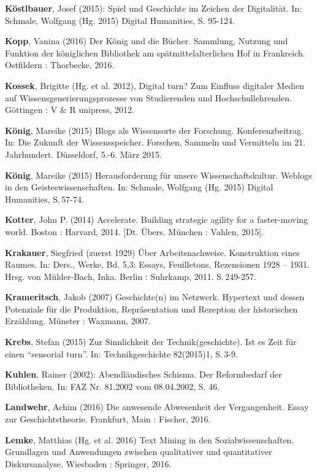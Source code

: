 \documentclass[a4paper,
fontsize=11pt,
oneside,
numbers=noperiodatend,
parskip=half-,
bibliography=totoc,
final
]{scrartcl}
\begin{document}
\textbf{Köstlbauer}, Josef (2015): Spiel und Geschichte im Zeichen der
Digitalität. In: Schmale, Wolfgang (Hg. 2015) Digital Humanities, S.
95-124.

\textbf{Kopp}, Vanina (2016) Der König und die Bücher. Sammlung, Nutzung
und Funktion der königlichen Bibliothek am spätmittelalterlichen Hof in
Frankreich. Ostfildern : Thorbecke, 2016.

\textbf{Kossek}, Brigitte (Hg. et al. 2012), Digital turn? Zum Einfluss
digitaler Medien auf Wissensgenerierungsprozesse von Studierenden und
Hochschullehrenden. Göttingen : V \& R unipress, 2012.

\textbf{König}, Mareike (2015) Blogs als Wissensorte der Forschung.
Konferenzbeitrag. In: Die Zukunft der Wissensspeicher. Forschen, Sammeln
und Vermitteln im 21. Jahrhundert. Düsseldorf, 5.-6. März 2015.

\textbf{König}, Mareike (2015) Herausforderung für unsere
Wissenschaftskultur. Weblogs in den Geisteswissenschaften. In: Schmale,
Wolfgang (Hg. 2015) Digital Humanities, S.\,57-74.

\textbf{Kotter}, John P. (2014) Accelerate. Building strategic agility
for a faster-moving world. Boston : Harvard, 2014. {[}Dt. Übers. München
: Vahlen, 2015{]}.

\textbf{Krakauer}, Siegfried (zuerst 1929) Über Arbeitsnachweise.
Konstruktion eines Raumes. In: Ders., Werke, Bd. 5,3: Essays,
Feuilletons, Rezensionen 1928 -- 1931. Hrsg. von Mülder-Bach, Inka.
Berlin : Suhrkamp, 2011. S.\,249-257.

\textbf{Krameritsch}, Jakob (2007) Geschichte(n) im Netzwerk. Hypertext
und dessen Potenziale für die Produktion, Repräsentation und Rezeption
der historischen Erzählung. Münster : Waxmann, 2007.

\textbf{Krebs}, Stefan (2015) Zur Sinnlichkeit der Technik(geschichte).
Ist es Zeit für einen \enquote{sensorial turn}. In: Technikgeschichte
82(2015)1, S.\,3-9.

\textbf{Kuhlen}, Rainer (2002): Abendländisches Schisma. Der
Reformbedarf der Bibliotheken. In: FAZ Nr. 81.2002 vom 08.04.2002, S.
46.

\textbf{Landwehr}, Achim (2016) Die anwesende Abwesenheit der
Vergangenheit. Essay zur Geschichtstheorie. Frankfurt, Main : Fischer,
2016.

\textbf{Lemke}, Matthias (Hg. et al. 2016) Text Mining in den
Sozialwissenschaften. Grundlagen und Anwendungen zwischen qualitativer
und quantitativer Diskursanalyse. Wiesbaden : Springer, 2016.
\end{document}
